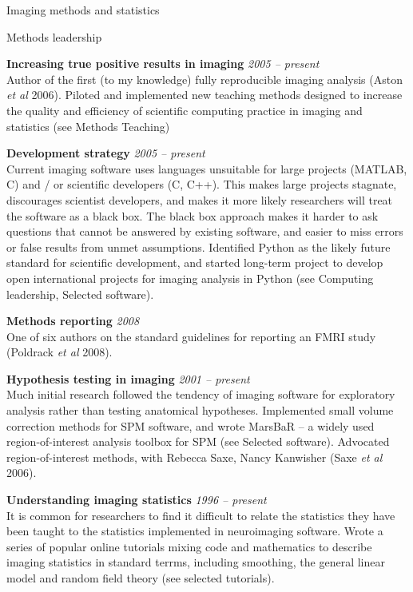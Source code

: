 \documentclass{cv}
\newcommand{\PlaceDateNote}[3]{{\bf #1} \hfill {\em #2} \\#3}
\begin{document}
\begin{cvSection}{Imaging methods and statistics}

\begin{cvSubSection}{Methods leadership}

\PlaceDateNote{Increasing true positive results in imaging}{2005 -- present}
{Author of the first (to my knowledge) fully reproducible imaging analysis
    (Aston {\em et al} 2006).  Piloted and implemented new teaching methods
    designed to increase the quality and efficiency of scientific computing
practice in imaging and statistics (see Methods Teaching)}

\PlaceDateNote{Development strategy}{2005 -- present}
{Current imaging software uses languages unsuitable for large projects
    (MATLAB, C) and / or scientific developers (C, C++).  This makes large
    projects stagnate, discourages scientist developers, and makes it more
    likely researchers will treat the software as a black box. The black
    box approach makes it harder to ask questions that cannot be answered
    by existing software, and easier to miss errors or false results from
    unmet assumptions.  Identified Python as the likely future standard for
    scientific development, and started long-term project to develop open
    international projects for imaging analysis in Python (see Computing
    leadership, Selected software).
}

\PlaceDateNote{Methods reporting}{2008}
{One of six authors on the standard guidelines for reporting an FMRI study
(Poldrack {\em et al} 2008).}

\PlaceDateNote{Hypothesis testing in imaging}{2001 -- present}
{Much initial research followed the tendency of imaging software for
    exploratory analysis rather than testing anatomical hypotheses.
    Implemented small volume correction methods for SPM software, and wrote
    MarsBaR -- a widely used region-of-interest analysis toolbox for SPM
    (see Selected software).  Advocated region-of-interest methods, with
Rebecca Saxe, Nancy Kanwisher (Saxe {\em et al} 2006).}

\PlaceDateNote{Understanding imaging statistics}{1996 -- present}
{It is common for researchers to find it difficult to relate the statistics
    they have been taught to the statistics implemented in neuroimaging
    software.  Wrote a series of popular online tutorials mixing code and
mathematics to describe imaging statistics in standard terrms, including
smoothing, the general linear model and random field theory (see selected
tutorials).}


\end{cvSubSection}
\end{cvSection}
\end{document}
